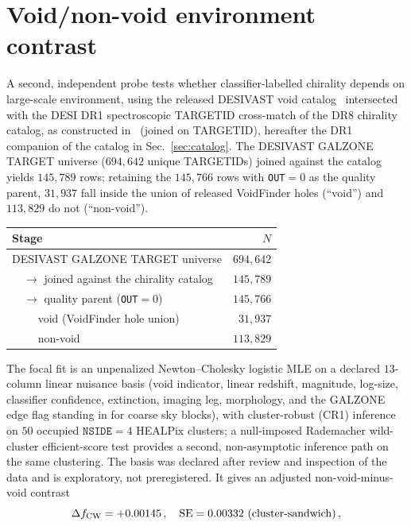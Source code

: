 \documentclass[twocolumn,linenumbers]{aastex702}
\newcommand{\nside}{\texttt{NSIDE}}
\begin{document}
\section{Void/non-void environment contrast}
\label{sec:void}

A second, independent probe tests whether classifier-labelled chirality
depends on large-scale environment, using the released DESIVAST
void catalog~\cite{DESIVAST:2025} intersected with the DESI DR1 spectroscopic TARGETID cross-match of the DR8 chirality catalog, as constructed in~\cite{Golden:P5v147} (joined on TARGETID), hereafter the DR1 companion of the
catalog in Sec.~\ref{sec:catalog}. The DESIVAST GALZONE TARGET universe
($694{,}642$ unique TARGETIDs) joined against the catalog yields $145{,}789$
rows; retaining the $145{,}766$ rows with \texttt{OUT}$=0$ as the quality
parent, $31{,}937$ fall inside the union of released VoidFinder holes
(``void'') and $113{,}829$ do not (``non-void'').
\begin{center}
\footnotesize
\begin{tabular}{lr}
\toprule
Stage & $N$ \\
\midrule
DESIVAST GALZONE TARGET universe & $694{,}642$ \\
$\quad\to$ joined against the chirality catalog & $145{,}789$ \\
$\quad\to$ quality parent (\texttt{OUT}$=0$) & $145{,}766$ \\
$\qquad$ void (VoidFinder hole union) & $31{,}937$ \\
$\qquad$ non-void & $113{,}829$ \\
\bottomrule
\end{tabular}
\end{center}
The focal fit is an unpenalized Newton--Cholesky logistic MLE on a
declared $13$-column linear nuisance basis (void indicator,
linear redshift, magnitude, log-size, classifier confidence, extinction,
imaging leg, morphology, and the GALZONE edge flag standing in for coarse
sky blocks), with cluster-robust (CR1) inference on $50$ occupied
$\nside=4$ HEALPix clusters; a null-imposed Rademacher wild-cluster
efficient-score test provides a second, non-asymptotic inference path on
the same clustering. The basis was declared after review and inspection of
the data and is exploratory, not preregistered. It gives an adjusted
non-void-minus-void contrast
\begin{equation}
\Delta f_{\rm CW} = +0.00145\,,\quad \mathrm{SE}=0.00332\ (\mathrm{cluster\text{-}sandwich})\,,
\label{eq:void_contrast}
\end{equation}
\end{document}
